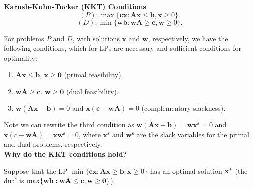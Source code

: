 \vspace{6mm}\underline{\bf Karush-Kuhn-Tucker (KKT) Conditions} \\
$$(P):\max\{\mathbf{cx}: \mathbf{Ax} \le \mathbf{b}, \mathbf{x} \ge 0\}.$$ 
$$(D):\min\{\mathbf{wb}: \mathbf{wA} \ge \mathbf{c}, \mathbf{w} \ge 0\}.$$

\vspace{3mm} For problems $P$ and $D$, with solutions $\mathbf{x}$ and $\mathbf{w}$, respectively, we have the following conditions, which for LPs are necessary and sufficient conditions for optimality:
\begin{enumerate}
\item $\mathbf{Ax} \le \mathbf{b}$,  $\mathbf{x} \ge \mathbf{0}$ (primal feasibility).
\item $\mathbf{wA} \ge \mathbf{c}$, $\mathbf{w} \ge \mathbf{0}$  (dual feasibility).
\item $\mathbf{w}(\mathbf{Ax}-\mathbf{b}) = 0$ and $\mathbf{x}(\mathbf{c}- \mathbf{wA}) = 0$ (complementary slackness).
\end{enumerate}
Note we can rewrite the third condition as $\mathbf{w}(\mathbf{Ax}-\mathbf{b}) = \mathbf{w}\mathbf{x^s} = 0$ and $\mathbf{x}(c- \mathbf{wA}) = \mathbf{x}\mathbf{w^s} = 0$, where $\mathbf{x^s}$ and $\mathbf{w^s}$ are the slack variables for the primal and dual problems, respectively. \\

{\bf Why do the KKT conditions hold?}

\vspace{3mm}
Suppose that the LP $\min\{\mathbf{cx}: \mathbf{Ax} \ge \mathbf{b}, \mathbf{x} \ge 0\}$ has an optimal solution ${\bf x^*}$ (the dual is $\max\{{\bf wb}: {\bf wA} \le {\bf c}, {\bf w} \ge {\bf 0}\}$).

